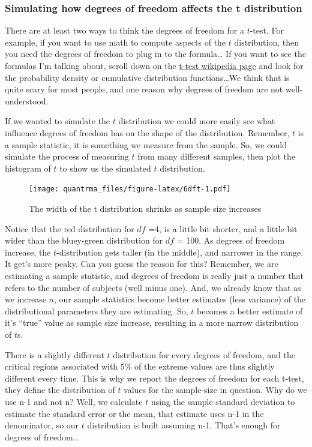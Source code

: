 \documentclass[
]{book}
\begin{document}
\hypertarget{simulating-how-degrees-of-freedom-affects-the-t-distribution}{%
\subsubsection{Simulating how degrees of freedom affects the t distribution}\label{simulating-how-degrees-of-freedom-affects-the-t-distribution}}

There are at least two ways to think the degrees of freedom for a \(t\)-test. For example, if you want to use math to compute aspects of the \(t\) distribution, then you need the degrees of freedom to plug in to the formula\ldots{} If you want to see the formulas I'm talking about, scroll down on the \href{https://en.wikipedia.org/wiki/Student\%27s_t-distribution}{t-test wikipedia page} and look for the probability density or cumulative distribution functions\ldots We think that is quite scary for most people, and one reason why degrees of freedom are not well-understood.

If we wanted to simulate the \(t\) distribution we could more easily see what influence degrees of freedom has on the shape of the distribution. Remember, \(t\) is a sample statistic, it is something we measure from the sample. So, we could simulate the process of measuring \(t\) from many different samples, then plot the histogram of \(t\) to show us the simulated \(t\) distribution.

\begin{figure}
\centering
\texttt{[image: quantrma\_files/figure-latex/6dft-1.pdf]}
\caption{\label{fig:6dft}The width of the t distribution shrinks as sample size increases}
\end{figure}

Notice that the red distribution for \(df\) =4, is a little bit shorter, and a little bit wider than the bluey-green distribution for \(df\) = 100. As degrees of freedom increase, the \(t\)-distribution gets taller (in the middle), and narrower in the range. It get's more peaky. Can you guess the reason for this? Remember, we are estimating a sample statistic, and degrees of freedom is really just a number that refers to the number of subjects (well minus one). And, we already know that as we increase \(n\), our sample statistics become better estimates (less variance) of the distributional parameters they are estimating. So, \(t\) becomes a better estimate of it's ``true'' value as sample size increase, resulting in a more narrow distribution of \(t\)s.

There is a slightly different \(t\) distribution for every degrees of freedom, and the critical regions associated with 5\% of the extreme values are thus slightly different every time. This is why we report the degrees of freedom for each t-test, they define the distribution of \(t\) values for the sample-size in question. Why do we use n-1 and not n? Well, we calculate \(t\) using the sample standard deviation to estimate the standard error or the mean, that estimate uses n-1 in the denominator, so our \(t\) distribution is built assuming n-1. That's enough for degrees of freedom\ldots{}
\end{document}
